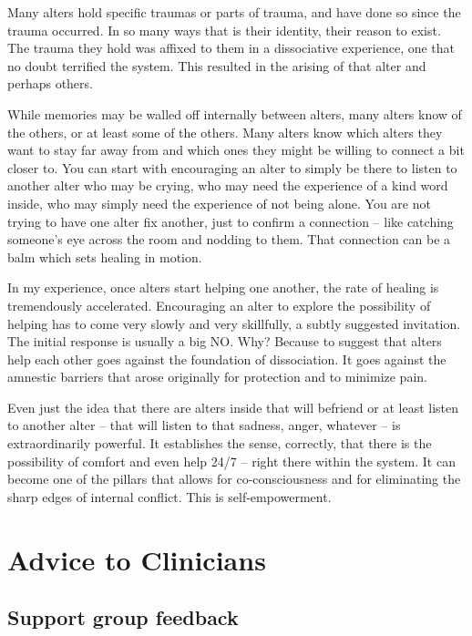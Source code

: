 \documentclass[]{book}
\begin{document}
Many alters hold specific traumas or parts of trauma, and have done so since the trauma occurred. In so many ways that is their identity, their reason to exist. The trauma they hold was affixed to them in a dissociative experience, one that no doubt terrified the system. This resulted in the arising of that alter and perhaps others.

While memories may be walled off internally between alters, many alters know of the others, or at least some of the others. Many alters know which alters they want to stay far away from and which ones they might be willing to connect a bit closer to. You can start with encouraging an alter to simply be there to listen to another alter who may be crying, who may need the experience of a kind word inside, who may simply need the experience of not being alone. You are not trying to have one alter fix another, just to confirm a connection -- like catching someone's eye across the room and nodding to them. That connection can be a balm which sets healing in motion.

In my experience, once alters start helping one another, the rate of healing is tremendously accelerated. Encouraging an alter to explore the possibility of helping has to come very slowly and very skillfully, a subtly suggested invitation. The initial response is usually a big NO. Why? Because to suggest that alters help each other goes against the foundation of dissociation. It goes against the amnestic barriers that arose originally for protection and to minimize pain.

Even just the idea that there are alters inside that will befriend or at least listen to another alter -- that will listen to that sadness, anger, whatever -- is extraordinarily powerful. It establishes the sense, correctly, that there is the possibility of comfort and even help 24/7 -- right there within the system. It can become one of the pillars that allows for co-consciousness and for eliminating the sharp edges of internal conflict. This is self-empowerment.

\hypertarget{advice-to-clinicians}{%
\chapter{Advice to Clinicians}\label{advice-to-clinicians}}

\hypertarget{support-group-feedback}{%
\section{Support group feedback}\label{support-group-feedback}}
\end{document}
